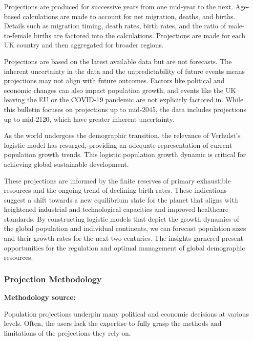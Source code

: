 Projections are produced for successive years from one mid-year to the next. Age-based calculations are made to account for net migration, deaths, and births. Details such as migration timing, death rates, birth rates, and the ratio of male-to-female births are factored into the calculations. Projections are made for each UK country and then aggregated for broader regions.

Projections are based on the latest available data but are not forecasts. The inherent uncertainty in the data and the unpredictability of future events means projections may not align with future outcomes. Factors like political and economic changes can also impact population growth, and events like the UK leaving the EU or the COVID-19 pandemic are not explicitly factored in. While this bulletin focuses on projections up to mid-2045, the data includes projections up to mid-2120, which have greater inherent uncertainty.


As the world undergoes the demographic transition, the relevance of Verhulst's
logistic model has resurged, providing an adequate representation of current
population growth trends. This logistic population growth dynamic is critical
for achieving global sustainable development.

These projections are informed by the finite reserves of primary exhaustible
resources and the ongoing trend of declining birth rates. These indications
suggest a shift towards a new equilibrium state for the planet that aligns with
heightened industrial and technological capacities and improved healthcare
standards. By constructing logistic models that depict the growth dynamics of
the global population and individual continents, we can forecast population
sizes and their growth rates for the next two centuries. The insights garnered
present opportunities for the regulation and optimal management of global
demographic resources.

\subsubsection{Projection Methodology}

\textbf{Methodology source:}~\cite{vanella2020populationprojections}

Population projections underpin many political and economic decisions at
various levels. Often, the users lack the expertise to fully grasp the methods
and limitations of the projections they rely on.

